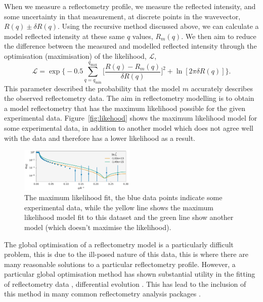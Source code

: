 \documentclass[
 reprint,
 superscriptaddress,
 amsmath,amssymb,
 aps,
]{revtex4-2}
\begin{document}
When we measure a reflectometry profile, we measure the reflected intensity, and some uncertainty in that measurement, at discrete points in the wavevector, $R(q) \pm \delta R(q)$. 
Using the recursive method discussed above, we can calculate a model reflected intensity at these same $q$ values, $R_m(q)$. 
We then aim to reduce the difference between the measured and modelled reflected intensity through the optimisation (maximisation) of the likelihood, $\mathcal{L}$, 
%
\begin{equation}
    \mathcal{L} = \exp{\bigg\{-0.5 \sum_{q=q_{\text{min}}}^{q_{\text{max}}} \bigg[\frac{R(q) - R_m(q)}{\delta R(q)}\bigg]^2 + \ln[2\pi \delta R(q)]\bigg\}}.
\end{equation}
%
This parameter described the probability that the model $m$ accurately describes the observed reflectometry data. 
The aim in reflectometry modelling is to obtain a model reflectometry that has the maximum likelihood possible for the given experimental data. 
Figure~\ref{fig:likehood} shows the maximum likelihood model for some experimental data, in addition to another model which does not agree well with the data and therefore has a lower likelihood as a result. 
%
\begin{figure}[t]
    \includegraphics[width=0.49\textwidth]{likelihood}
    \caption{The maximum likelihood fit, the blue data points indicate some experimental data, while the yellow line shows the maximum likelihood model fit to this dataset and the green line show another model (which doesn't maximise the likelihood).}
    \label{fig:likelihood}
\end{figure}
%

The global optimisation of a reflectometry model is a particularly difficult problem, this is due to the ill-posed nature of this data, this is where there are many reasonable solutions to a particular reflectometry profile.
However, a particular global optimisation method has shown substantial utility in the fitting of reflectometry data \cite{varderlee_comparison_2007}, differential evolution \cite{wormington_characterization_1999}.
This has lead to the inclusion of this method in many common reflectometry analysis packages \cite{bjorck_fitting_2011}.
\end{document}
